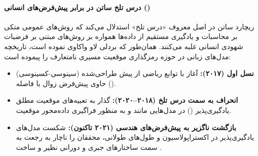 \paragraph*{درس تلخ ساتن در برابر پیش‌فرض‌های انسانی ()}
ریچارد ساتن در اصل معروف «درس تلخ» استدلال می‌کند که روش‌های عمومی متکی بر محاسبات و یادگیری مستقیم از داده‌ها همواره بر روش‌های مبتنی بر فرضیات شهودی انسانی غلبه می‌کنند. همان‌طور که بردلی لاو \cite{love2025giving} واکاوی نموده است، تاریخچه مدل‌های زبانی در حوزه رمزگذاری موقعیت مسیری نامتعارف را پیموده است:
\begin{itemize}
    \item \textbf{نسل اول (۲۰۱۷):} آغاز با توابع ریاضی از پیش طراحی‌شده (سینوسی-کسینوسی) حاوی پیش‌فرض زوال با فاصله ().
    \item \textbf{انحراف به سمت درس تلخ (۲۰۱۸--۲۰۲۰):} گذار به تعبیه‌های موقعیت مطلق یادگیری‌پذیر () در مدل‌هایی مانند  و  به منظور فراگیری داده‌محور موقعیت.
    \item \textbf{بازگشت ناگزیر به پیش‌فرض‌های هندسی (۲۰۲۱ تاکنون):} شکست مدل‌های یادگیری‌پذیر در اکستراپولاسیون و طول‌های طولانی، محققان را ناچار به رجعت به سمت ساختارهای جبری و دورانی نظیر  و  ساخت \cite{love2025giving}.
\end{itemize}

